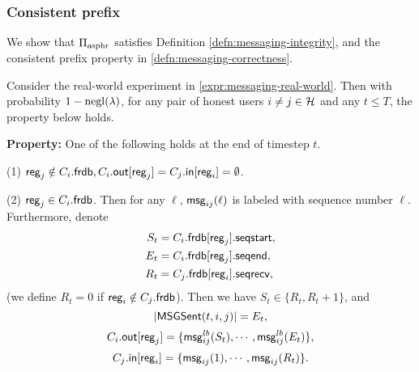 \subsubsection{Consistent prefix} We show that $\Pi_{\text{asphr}}$ satisfies Definition \ref{defn:messaging-integrity}, and the consistent prefix property in \cref{defn:messaging-correctness}.
\begin{lemma}
\label{lem:messaging-correctness-main}
Consider the real-world experiment in \cref{expr:messaging-real-world}. Then with probability $1 - \operatorname{negl}(\lambda)$, for any pair of honest users $i \neq j \in \mathcal{H}$ and any $t \leq T$, the property below holds.

\textbf{Property: }One of the following holds at the end of timestep $t$.

(1) $\mathsf{reg}_j \notin C_i.\mathsf{frdb}, C_i.\mathsf{out}[\mathsf{reg}_j] = C_j.\mathsf{in}[\mathsf{reg}_i] = \emptyset$.

(2) $\mathsf{reg}_j \in C_i.\mathsf{frdb}$. Then  for any $\ell$, $\mathsf{msg}_{ij}(\ell)$ is labeled with sequence number $\ell$. Furthermore, denote
\begin{align*}
S_t &= C_i.\mathsf{frdb}[\mathsf{reg}_j].\mathsf{seqstart}, \\
E_t &= C_i.\mathsf{frdb}[\mathsf{reg}_j].\mathsf{seqend}, \\
R_t &= C_j.\mathsf{frdb}[\mathsf{reg}_i].\mathsf{seqrecv},
\end{align*}
(we define $R_t = 0$ if $\mathsf{reg}_i \notin C_j.\mathsf{frdb}$). Then we have $S_t \in \{R_t, R_t + 1\}$, and
$$\left| \mathsf{MSGSent}(t, i, j) \right| = E_t,$$
$$C_i.\mathsf{out}[\mathsf{reg}_j] = \{\mathsf{msg}^{lb}_{ij}(S_t), \cdots, \mathsf{msg}^{lb}_{ij}(E_t)\},$$
$$C_j.\mathsf{in}[\mathsf{reg}_i] = \{\mathsf{msg}_{ij}(1), \cdots, \mathsf{msg}_{ij}(R_t)\}.$$
\end{lemma}
